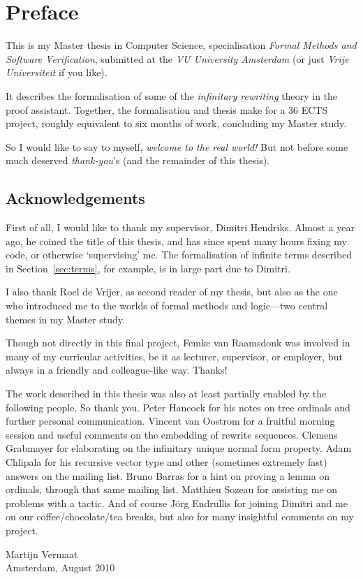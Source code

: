 \chapter*{Preface}
\thispagestyle{empty}

This is my Master thesis in Computer Science,
specialisation \emph{Formal Methods and Software Verification},
submitted at the \emph{VU University Amsterdam} (or just \emph{Vrije
  Universiteit} if you like).

It describes the formalisation of some of the \emph{infinitary
  rewriting} theory in the \Coq proof assistant.
Together, the formalisation and thesis make
for a 36 ECTS project, roughly equivalent to six months of work,
concluding my Master study.

So I would like to say to myself, \emph{welcome to the real world!}
But not before some much deserved \emph{thank-you}'s (and the
remainder of this thesis).


\section*{Acknowledgements}

First of all, I would like to thank my supervisor, Dimitri
Hendriks. Almost a year ago, he coined the title of this thesis, and
has since spent many hours fixing my \Coq code, or otherwise
`supervising' me. The formalisation of infinite terms described in
Section~\ref{sec:terms}, for example, is in large part due to
Dimitri.

I also thank Roel de Vrijer, as second reader of my thesis, but also
as the one who introduced me to the worlds of formal methods and
logic---two central themes in my Master study.

Though not directly in this final project, Femke van Raamsdonk was
involved in many of my curricular activities, be it as lecturer,
supervisor, or employer, but always in a friendly and colleague-like
way. Thanks!

The work described in this thesis was also at least partially enabled
by the following people. So thank you. Peter Hancock for his notes on
tree ordinals and further personal communication. Vincent van Oostrom
for a fruitful morning session and useful comments on the embedding of
rewrite sequences. Clemens Grabmayer for elaborating on the infinitary
unique normal form property. Adam Chlipala for his recursive vector type and
other (sometimes extremely fast) answers on the \Coq mailing
list. Bruno Barras for a hint on proving a lemma on ordinals, through
that same mailing list. Matthieu Sozeau for assisting me on problems
with a \Coq tactic. And of course J\"org Endrullis for joining Dimitri
and me on our coffee/chocolate/tea breaks, but also for many insightful
comments on my project.


\thispagestyle{empty}

\begin{flushright}
  Martijn Vermaat\\
  Amsterdam, August 2010
\end{flushright}
